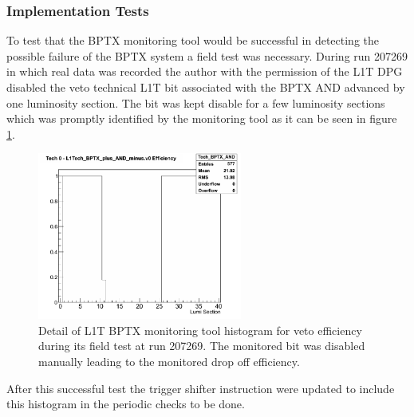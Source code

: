 \subsubsection{Implementation Tests}


To test that the \gls{BPTX} monitoring tool would be successful in detecting the possible failure of the \gls{BPTX} system a field test was necessary. During run 207269 in which real data was recorded the author with the permission of the \gls{L1T} \gls{DPG} disabled the veto technical \gls{L1T} bit associated with the \gls{BPTX} AND advanced by one luminosity section. The bit was kept disable for a few luminosity sections which was promptly identified by the monitoring tool as it can be seen in figure \ref{FIGURE:TechnicalWork_L1TBPTX_ImplementationTests}.

\begin{figure}[!htb]
\centering
\includegraphics[width=0.60\textwidth]{Chapter03/L1TOnline/Images/L1TBPTX_Tech_BPTX_AND.png}
\caption{Detail of \gls{L1T} \gls{BPTX} monitoring tool histogram for veto efficiency during its field test at run 207269. The monitored bit was disabled manually leading to the monitored drop off efficiency.} 
\label{FIGURE:TechnicalWork_L1TBPTX_ImplementationTests}
\end{figure}

After this successful test the trigger shifter instruction were updated to include this histogram in the periodic checks to be done.  

